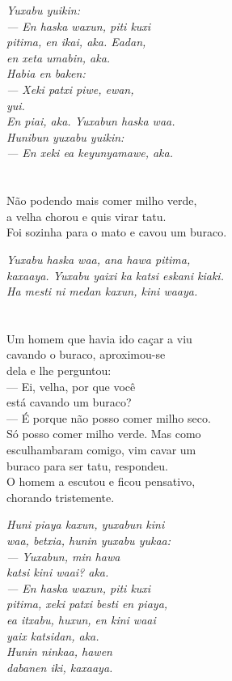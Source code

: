 \textit{Yuxabu yuikin:\\
--- En haska waxun, piti kuxi\\
pitima, en ikai, aka. Eadan,\\
en xeta umabin, aka.\\
Habia en baken:\\
--- Xeki patxi piwe, ewan,\\
yui.\\
En piai, aka. Yuxabun haska waa.\\
Hunibun yuxabu yuikin:\\
--- En xeki ea keyunyamawe, aka.}

\chapter{}

Não podendo mais comer milho verde,\\
a velha chorou e quis virar tatu.\\
Foi sozinha para o mato e cavou um buraco.

\textit{Yuxabu haska waa, ana hawa pitima,\\
kaxaaya. Yuxabu yaixi ka katsi eskani kiaki.\\
Ha mesti ni medan kaxun, kini waaya.}

\chapter{}

Um homem que havia ido caçar a viu\\
cavando o buraco, aproximou-se\\
dela e lhe perguntou:\\
--- Ei, velha, por que você\\
está cavando um buraco?\\
--- É porque não posso comer milho seco.\\
Só posso comer milho verde. Mas como\\
esculhambaram comigo, vim cavar um\\
buraco para ser tatu, respondeu.\\
O homem a escutou e ficou pensativo,\\
chorando tristemente.

\textit{Huni piaya kaxun, yuxabun kini\\
waa, betxia, hunin yuxabu yukaa:\\
--- Yuxabun, min hawa\\
katsi kini waai? aka.\\
--- En haska waxun, piti kuxi\\
pitima, xeki patxi besti en piaya,\\
ea itxabu, huxun, en kini waai\\
yaix katsidan, aka.\\
Hunin ninkaa, hawen\\
dabanen iki, kaxaaya.}

